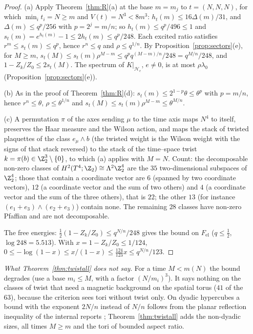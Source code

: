 \begin{proof}
(a) Apply Theorem~\ref{thm:R}(a) at the base $m=m_j$ to $t=(N,N,N)$, for which $\min_it_i=N\ge m$ and $V(t)=N^3<8m^3$: $h_t(m)\le16\Delta(m)/31$, and $\Delta(m)\le q^p/256$ with $p=2^j=m/n$; so $h_t(m)\le q^p/496\le1$ and $s_t(m)=e^{h_t(m)}-1\le2h_t(m)\le q^p/248$. Each excited ratio satisfies $r^m\le s_t(m)\le q^p$, hence $r^n\le q$ and $\rho\le q^{1/n}$. By Proposition~\ref{prop:sectors}(e), for $M\ge m$, $s_t(M)\le s_t(m)\rho^{M-m}\le q^{p}q^{(M-m)/n}/248=q^{M/n}/248$, and $1-Z_k/Z_0\le2s_t(M)$. The spectrum of $K|_{\mathcal H_e}$, $e\ne0$, is at most $\rho\lambda_0$ (Proposition~\ref{prop:sectors}(e)).

(b) As in the proof of Theorem~\ref{thm:R}(d): $s_t(m)\le2^{1-p}\theta\le\theta^p$ with $p=m/n$, hence $r^n\le\theta$, $\rho\le\theta^{1/n}$ and $s_t(M)\le s_t(m)\rho^{M-m}\le\theta^{M/n}$.

(c) A permutation $\pi$ of the axes sending $\mu$ to the time axis maps $N^4$ to itself, preserves the Haar measure and the Wilson action, and maps the stack of twisted plaquettes of the class $e_\mu\wedge b$ (the twisted weight is the Wilson weight with the signs of that stack reversed) to the stack of the time--space twist $k=\pi(b)\in\Z_2^3\setminus\{0\}$, to which (a) applies with $M=N$. Count: the decomposable non-zero classes of $H^2(T^4;\Z_2)\cong\Lambda^2\Z_2^4$ are the $35$ two-dimensional subspaces of $\Z_2^4$; those that contain a coordinate vector are $6$ (spanned by two coordinate vectors), $12$ (a coordinate vector and the sum of two others) and $4$ (a coordinate vector and the sum of the three others), that is $22$; the other $13$ (for instance $(e_1+e_3)\wedge(e_2+e_3)$) contain none. The remaining $28$ classes have non-zero Pfaffian and are not decomposable.

The free energies: $\frac12(1-Z_k/Z_0)\le q^{N/n}/248$ gives the bound on $F_{\mathrm{el}}$ ($q\le\frac12$, $\log248=5.513$). With $x=1-Z_k/Z_0\le1/124$, $0\le-\log(1-x)\le x/(1-x)\le\frac{124}{123}x\le q^{N/n}/123$.
\end{proof}
\emph{What Theorem~\ref{thm:twistall} does not say.} For a time $M<m(N)$ the bound degrades (use a base $m_i\le M$, with a factor $(N/m_i)^3$). It says nothing on the classes of twist that need a magnetic background on the spatial torus ($41$ of the $63$), because the criterion sees tori without twist only. On dyadic hypercubes a bound with the exponent $2N/n$ instead of $N/n$ follows from the planar reflection inequality of the internal reports \cite{internal}; Theorem~\ref{thm:twistall} adds the non-dyadic sizes, all times $M\ge m$ and the tori of bounded aspect ratio.

